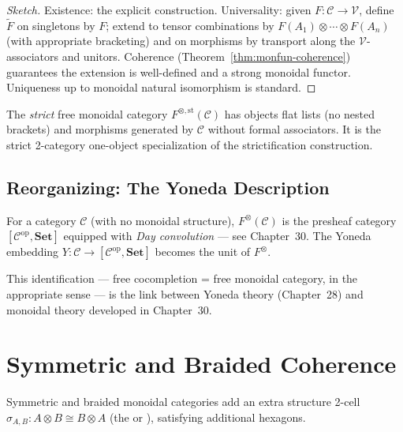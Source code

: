 \begin{proof}[Sketch]
Existence: the explicit construction. Universality: given $F : \mathcal{C}
\to \mathcal{V}$, define $\widetilde F$ on singletons by $F$; extend to
tensor combinations by $F(A_1) \otimes \cdots \otimes F(A_n)$ (with
appropriate bracketing) and on morphisms by transport along the
$\mathcal{V}$-associators and unitors. Coherence (Theorem~\ref{thm:monfun-coherence})
guarantees the extension is well-defined and a strong monoidal functor.
Uniqueness up to monoidal natural isomorphism is standard.
\end{proof}

\begin{remark}
The \emph{strict} free monoidal category $F^{\otimes,\mathrm{st}}(\mathcal{C})$
has objects flat lists (no nested brackets) and morphisms generated by $\mathcal{C}$
without formal associators. It is the strict 2-category one-object specialization
of the strictification construction.
\end{remark}

\subsection{Reorganizing: The Yoneda Description}

\begin{proposition}
\label{prop:free-mon-day}
For a category $\mathcal{C}$ (with no monoidal structure), $F^\otimes(\mathcal{C})$
is the presheaf category $[\mathcal{C}^{\mathrm{op}}, \mathbf{Set}]$ equipped
with \emph{Day convolution} — see Chapter~30. The Yoneda embedding $Y :
\mathcal{C} \to [\mathcal{C}^{\mathrm{op}}, \mathbf{Set}]$ becomes the
unit of $F^\otimes$.
\end{proposition}

This identification — free cocompletion = free monoidal category, in the
appropriate sense — is the link between Yoneda theory (Chapter~28) and
monoidal theory developed in Chapter~30.


\section{Symmetric and Braided Coherence}
\label{sec:sym-coherence}

Symmetric and braided monoidal categories add an extra structure 2-cell
$\sigma_{A,B} : A \otimes B \cong B \otimes A$ (the  or
), satisfying additional hexagons.

